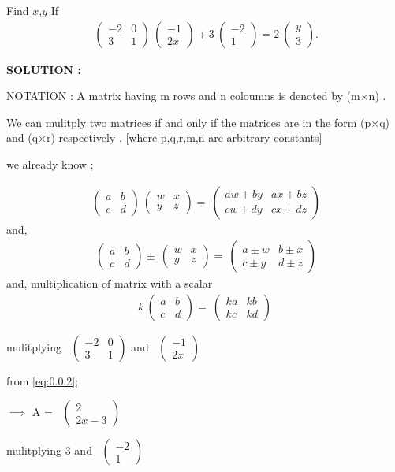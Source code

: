 \documentclass[journal,12pt,twocolumn]{IEEEtran}
\theoremstyle{remark}
\newcommand{\myvec}[1]{\ensuremath{\begin{pmatrix}#1\end{pmatrix}}}
\numberwithin{equation}{subsection}
\begin{document}
  Find $x$,$ y $       
       If 
       \begin{align}
       \ \myvec{-2 & 0\\3 & 1}
\ \myvec{-1\\2x}  
 + 3\ \myvec{-2 \\1 } 
 = 2\ \myvec{y \\3 } .
        \end{align}

  \bigskip
  \textbf{SOLUTION : }  
  
  {NOTATION : } A matrix having m rows and n coloumns is denoted by (m$\times$n) .
  
  We can mulitply two matrices if and only if the matrices are in the form (p$\times$q) and (q$\times$r) respectively .
   [where p,q,r,m,n are arbitrary constants]
   
  we already know ;
    
    \begin{align}
    \label{eq:0.0.2}
       \ \myvec{a & b \\c & d } 
      \ \myvec{w & x \\y & z } 
      =
       \ \myvec{aw+ by & ax+ bz \\cw+ dy& cx+ dz} 
    \end{align}
    and,
    \begin{align}
    \label{eq:0.0.3}
      \ \myvec{a & b \\c & d } 
      \pm
      \ \myvec{w & x \\y & z } 
      =
       \ \myvec{a\pm w & b\pm x \\c\pm y& d\pm z} 
    \end{align}
    and,
    multiplication of matrix with a scalar
    \begin{align}
    \label{eq:0.0.4}
     k \ \myvec{a & b \\c & d } 
      =
       \ \myvec{ka & kb \\kc & kd } 
    \end{align}
    
   mulitplying \ \myvec{-2 & 0 \\3 & 1 } 
      and 
      \ \myvec{-1 \\2x }
      
     from \eqref{eq:0.0.2};
      
      $\implies$  A = \ \myvec{2 \\2x-3 } 
      
    mulitplying 
    $3$ and
       \ \myvec{-2 \\1 } 
      
\end{document}
